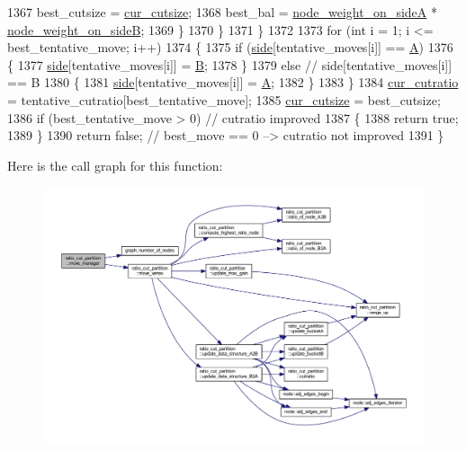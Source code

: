 \begin{DoxyCode}
1367         best\_cutsize = \mbox{\hyperlink{classratio__cut__partition_aa01f2d6257fff28739e2431fe826ef71}{cur\_cutsize}};
1368         best\_bal = \mbox{\hyperlink{classratio__cut__partition_af1b839e48e498cf8ca93c8ec5df8a686}{node\_weight\_on\_sideA}} * 
      \mbox{\hyperlink{classratio__cut__partition_aa16d1b508db86eb0ba4824642394999a}{node\_weight\_on\_sideB}};
1369         \}
1370     \}
1371     \}
1372 
1373     \textcolor{keywordflow}{for} (\textcolor{keywordtype}{int} i = 1; i <= best\_tentative\_move; i++)
1374     \{
1375     \textcolor{keywordflow}{if} (\mbox{\hyperlink{classratio__cut__partition_a2bf913d1d8607747885177a3b585e611}{side}}[tentative\_moves[i]] == \mbox{\hyperlink{classratio__cut__partition_a9c0da5ad845b01bddbc1f238fa35cdd0}{A}})
1376     \{
1377         \mbox{\hyperlink{classratio__cut__partition_a2bf913d1d8607747885177a3b585e611}{side}}[tentative\_moves[i]] = \mbox{\hyperlink{classratio__cut__partition_adf075987228d8adc7950d5b1ba332daa}{B}};
1378     \}
1379     \textcolor{keywordflow}{else}    \textcolor{comment}{// side[tentative\_moves[i]] == B}
1380     \{
1381         \mbox{\hyperlink{classratio__cut__partition_a2bf913d1d8607747885177a3b585e611}{side}}[tentative\_moves[i]] = \mbox{\hyperlink{classratio__cut__partition_a9c0da5ad845b01bddbc1f238fa35cdd0}{A}};
1382     \}
1383     \}
1384     \mbox{\hyperlink{classratio__cut__partition_a9dad324884cef5bcdd50122fc98e0860}{cur\_cutratio}} = tentative\_cutratio[best\_tentative\_move];
1385     \mbox{\hyperlink{classratio__cut__partition_aa01f2d6257fff28739e2431fe826ef71}{cur\_cutsize}} = best\_cutsize;
1386     \textcolor{keywordflow}{if} (best\_tentative\_move > 0)    \textcolor{comment}{// cutratio improved}
1387     \{
1388     \textcolor{keywordflow}{return} \textcolor{keyword}{true};
1389     \}
1390     \textcolor{keywordflow}{return} \textcolor{keyword}{false};   \textcolor{comment}{// best\_move == 0  -->  cutratio not improved}
1391 \}
\end{DoxyCode}
Here is the call graph for this function\+:\nopagebreak
\begin{figure}[H]
\begin{center}
\leavevmode
\includegraphics[width=350pt]{classratio__cut__partition_a16997844577ee3284a2b6fddbbea8c37_cgraph}
\end{center}
\end{figure}
